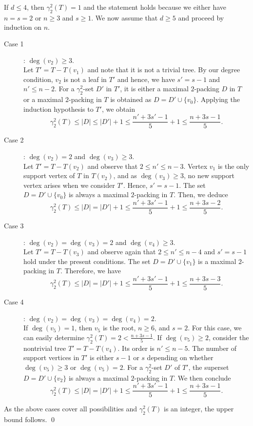 \documentclass[12pt]{article}
\newcommand{\mrho}{\gamma_2^2}
\begin{document}
If $d \leq 4$, then $\mrho(T)=1$ and the statement holds because we either have $n=s=2$ or $n \ge 3$ and $s \ge 1$. We now assume that $d \ge 5$ and proceed by induction on $n$. 
\begin{description}
    \item [Case 1]: $\deg(v_2) \ge 3$.\\
    Let $T'=T- T(v_1)$ and note that it is not a trivial tree. By our degree condition, $v_2$ is not a leaf in $T'$ and hence, we have $s'=s-1$ and $n'\leq n-2$. For a $\mrho$-set $D'$ in $T'$, it is either a maximal $2$-packing $D$ in $T$ or a maximal $2$-packing in $T$ is obtained as $D=D' \cup \{v_0\}$. Applying the induction hypothesis to $T'$, we obtain
    $$ \mrho(T) \leq |D| \leq |D'|+1 \leq \frac{n'+3s'-1}{5} +1 \leq \frac{n+3s-1}{5}. 
    $$
     \item [Case 2]: $\deg(v_2)=2$ and $\deg(v_3) \ge 3$.\\
      Let $T'=T- T(v_2)$ and observe that $2 \leq n' \leq n -3$. Vertex $v_1$ is the only support vertex of $T$ in $T(v_2)$, and as $\deg(v_3) \ge 3$, no new support vertex arises when we consider $T'$. Hence, $s' =s-1$. The set $D=D' \cup \{v_0\}$ is always a maximal $2$-packing in $T$. Then, we deduce
      $$\mrho(T) \leq |D| = |D'|+1 \leq \frac{n'+3s'-1}{5} +1 \leq \frac{n+3s-2}{5}.
      $$
      \item [Case 3]: $\deg(v_2)=\deg(v_3)=2$ and $\deg(v_4) \ge 3$.\\
      Let $T'=T- T(v_3)$ and observe again that $2 \leq n' \leq n -4$ and $s' =s-1$ hold under the present conditions. The set $D=D' \cup \{v_1\}$ is a maximal $2$-packing in $T$. Therefore, we have
      $$\mrho(T) \leq |D| = |D'|+1 \leq \frac{n'+3s'-1}{5} +1 \leq \frac{n+3s-3}{5}.
      $$
      \item [Case 4]: $\deg(v_2)=\deg(v_3)=\deg(v_4)= 2$.\\
      If $\deg(v_5)=1$, then $v_5$ is the root, $n \ge 6$, and $s=2$. For this case, we can easily determine $\mrho(T)=2 <\frac{n+3s-1}{5}$. If $\deg(v_5) \ge 2$, consider the nontrivial tree $T'=T- T(v_4)$. Its order is $n' \le n-5$. The number of support vertices in $T'$ is either $s-1$ or $s$ depending on whether $\deg(v_5)\ge 3$ or  $\deg(v_5)=2$. For a $\mrho$-set $D'$ of $T'$, the superset $D=D' \cup \{v_2\}$ is always a maximal $2$-packing in $T$. We then conclude
      $$\mrho(T) \leq |D| = |D'|+1 \leq \frac{n'+3s'-1}{5} +1 \leq \frac{n+3s-1}{5}.
      $$
      \end{description}
      As the above cases cover all possibilities and $\mrho(T)$ is an integer, the upper bound follows.
\qed      
\end{document}
